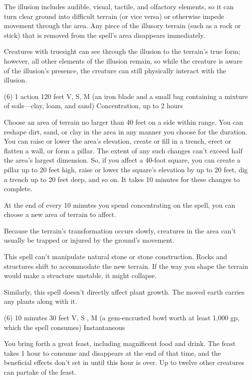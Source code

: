 The illusion includes audible, visual, tactile, and olfactory elements, so it can turn clear ground into difficult terrain (or vice versa) or otherwise impede movement through the area. Any piece of the illusory terrain (such as a rock or stick) that is removed from the spell's area disappears immediately.

Creatures with truesight can see through the illusion to the terrain's true form; however, all other elements of the illusion remain, so while the creature is aware of the illusion's presence, the creature can still physically interact with the illusion.

{(6)}
{1 action}
{120 feet}
{V, S, M (an iron blade and a small bag containing a mixture of soils—clay, loam, and sand)}
{Concentration, up to 2 hours}

Choose an area of terrain no larger than 40 feet on a side within range. You can reshape dirt, sand, or clay in the area in any manner you choose for the duration. You can raise or lower the area's elevation, create or fill in a trench, erect or flatten a wall, or form a pillar. The extent of any such changes can't exceed half the area's largest dimension. So, if you affect a 40-foot square, you can create a pillar up to 20 feet high, raise or lower the square's elevation by up to 20 feet, dig a trench up to 20 feet deep, and so on. It takes 10 minutes for these changes to complete.

At the end of every 10 minutes you spend concentrating on the spell, you can choose a new area of terrain to affect.

Because the terrain's transformation occurs slowly, creatures in the area can't usually be trapped or injured by the ground's movement.

This spell can't manipulate natural stone or stone construction. Rocks and structures shift to accommodate the new terrain. If the way you shape the terrain would make a structure unstable, it might collapse.

Similarly, this spell doesn't directly affect plant growth. The moved earth carries any plants along with it.

\label{spell:heroes-feast}
{(6)}
{10 minutes}
{30 feet}
{V, S , M (a gem-encrusted bowl worth at least 1,000 gp, which the spell consumes)}
{Instantaneous}

You bring forth a great feast, including magnificent food and drink. The feast takes 1 hour to consume and disappears at the end of that time, and the beneficial effects don't set in until this hour is over. Up to twelve other creatures can partake of the feast.

